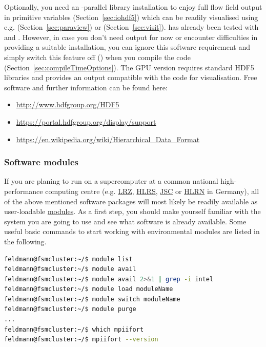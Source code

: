 \documentclass[a4paper, 11pt, DIV=11]{scrartcl}
\begin{document}
Optionally, you need an -parallel  library installation to
enjoy full flow field output in primitive variables (Section~\ref{sec:iohdf5})
which can be readily visualised using e.g. \paraview (Section~\ref{sec:paraview})
or \visit (Section~\ref{sec:visit}). \nsc has already been tested with
 and . However, in case you don't need
\hdf output for now or encounter difficulties in providing a suitable \hdf
installation, you can ignore this software requirement and simply switch this
feature off () when you compile the code
(Section~\ref{sec:compileTimeOptions}). 
The GPU version requires standard HDF5 libraries and provides an output
compatible with the  code for visualisation.
Free software and further information can
be found here:
\begin{itemize}
\item \url{http://www.hdfgroup.org/HDF5}
\item \url{https://portal.hdfgroup.org/display/support}
\item \url{https://en.wikipedia.org/wiki/Hierarchical_Data_Format}
\end{itemize}

\subsubsection{Software modules}
\label{sec:softwareModules}

If you are planing to run \nsc on a supercomputer at a common national
high-performance computing centre (e.g. \href{https://www.lrz.de/english/}{LRZ}, 
\href{https://www.hlrs.de/home/}{HLRS}, 
\href{http://www.fz-juelich.de/ias/jsc/EN/Home/home_node.html}{JSC} or 
\href{https://www.hlrn.de/home/}{HLRN} in Germany), all of the above mentioned
software packages will most likely be readily available as user-loadable 
\href{http://modules.sourceforge.net/}{modules}. As a first step, you should make
yourself familiar with the system you are going to use and see
what software is already available. Some useful basic commands to start working
with environmental modules are listed in the following.
\begin{lstlisting}[language=bash]
feldmann@fsmcluster:~/$ module list
feldmann@fsmcluster:~/$ module avail
feldmann@fsmcluster:~/$ module avail 2>&1 | grep -i intel
feldmann@fsmcluster:~/$ module load moduleName
feldmann@fsmcluster:~/$ module switch moduleName
feldmann@fsmcluster:~/$ module purge
...
feldmann@fsmcluster:~/$ which mpiifort
feldmann@fsmcluster:~/$ mpiifort --version
\end{lstlisting}
\end{document}

